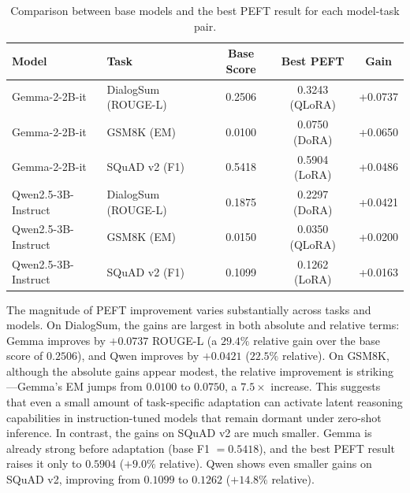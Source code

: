 \documentclass{article}
\begin{document}
\begin{table}[H]
\centering
\small
\caption{Comparison between base models and the best PEFT result for each model-task pair.}
\label{tab:base_vs_best}
\begin{tabular}{llccc}
\toprule
Model & Task & Base Score & Best PEFT & Gain \\
\midrule
Gemma-2-2B-it & DialogSum (ROUGE-L) & 0.2506 & 0.3243 (QLoRA) & +0.0737 \\
Gemma-2-2B-it & GSM8K (EM) & 0.0100 & 0.0750 (DoRA) & +0.0650 \\
Gemma-2-2B-it & SQuAD v2 (F1) & 0.5418 & 0.5904 (LoRA) & +0.0486 \\
Qwen2.5-3B-Instruct & DialogSum (ROUGE-L) & 0.1875 & 0.2297 (DoRA) & +0.0421 \\
Qwen2.5-3B-Instruct & GSM8K (EM) & 0.0150 & 0.0350 (QLoRA) & +0.0200 \\
Qwen2.5-3B-Instruct & SQuAD v2 (F1) & 0.1099 & 0.1262 (LoRA) & +0.0163 \\
\bottomrule
\end{tabular}
\end{table}

The magnitude of PEFT improvement varies substantially across tasks and models. On DialogSum, the gains are largest in both absolute and relative terms: Gemma improves by $+0.0737$ ROUGE-L (a $29.4\%$ relative gain over the base score of $0.2506$), and Qwen improves by $+0.0421$ ($22.5\%$ relative). On GSM8K, although the absolute gains appear modest, the relative improvement is striking---Gemma's EM jumps from $0.0100$ to $0.0750$, a $7.5\times$ increase. This suggests that even a small amount of task-specific adaptation can activate latent reasoning capabilities in instruction-tuned models that remain dormant under zero-shot inference. In contrast, the gains on SQuAD v2 are much smaller. Gemma is already strong before adaptation (base F1 $= 0.5418$), and the best PEFT result raises it only to $0.5904$ ($+9.0\%$ relative). Qwen shows even smaller gains on SQuAD v2, improving from $0.1099$ to $0.1262$ ($+14.8\%$ relative).
\end{document}
